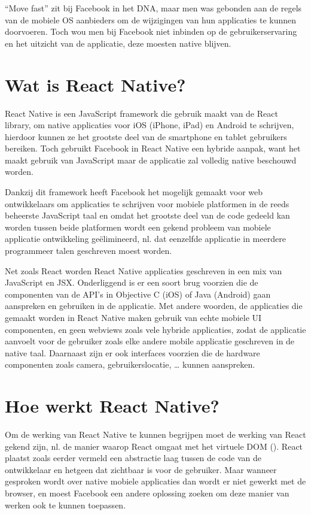 ``Move fast'' zit bij Facebook in het DNA, maar men was gebonden aan de regels van de mobiele OS aanbieders om de wijzigingen van hun applicaties te kunnen doorvoeren. Toch wou men bij Facebook niet inbinden op de gebruikerservaring en het uitzicht van de applicatie, deze moesten native blijven. \citep{occhino:React}

\section{Wat is React Native?}
React Native is een JavaScript framework die gebruik maakt van de React library, om native applicaties voor iOS (iPhone, iPad) en Android te schrijven, hierdoor kunnen ze het grootste deel van de smartphone en tablet gebruikers bereiken. Toch gebruikt Facebook in React Native een hybride aanpak, want het maakt gebruik van JavaScript maar de applicatie zal volledig native beschouwd worden.

Dankzij dit framework heeft Facebook het mogelijk gemaakt voor web ontwikkelaars om applicaties te schrijven voor mobiele platformen in de reeds beheerste JavaScript taal en omdat het grootste deel van de code gedeeld kan worden tussen beide platformen wordt een gekend probleem van mobiele applicatie ontwikkeling geëlimineerd, nl. dat eenzelfde applicatie in meerdere programmeer talen geschreven moest worden. 

Net zoals React worden React Native applicaties geschreven in een mix van JavaScript en JSX. Onderliggend is er een soort brug voorzien die de componenten van de API’s in Objective C (iOS) of Java (Android) gaan aanspreken en gebruiken in de applicatie. Met andere woorden, de applicaties die gemaakt worden in React Native maken gebruik van echte mobiele UI componenten, en geen webviews zoals vele hybride applicaties, zodat de applicatie aanvoelt voor de gebruiker zoals elke andere mobile applicatie geschreven in de native taal. Daarnaast zijn er ook interfaces voorzien die de hardware componenten zoals camera, gebruikerslocatie, … kunnen aanspreken.

\section{Hoe werkt React Native?}
Om de werking van React Native te kunnen begrijpen moet de werking van React gekend zijn, nl. de manier waarop React omgaat met het virtuele DOM (). React plaatst zoals eerder vermeld een abstractie laag tussen de code van de ontwikkelaar en hetgeen dat zichtbaar is voor de gebruiker. Maar wanneer gesproken wordt over native mobiele applicaties dan wordt er niet gewerkt met de browser, en moest Facebook een andere oplossing zoeken om deze manier van werken ook te kunnen toepassen. 

